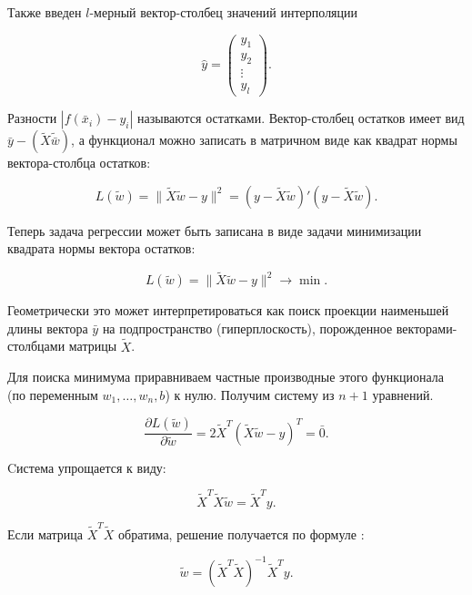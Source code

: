 \documentclass[11pt,a4paper]{article}
\begin{document}
Также введен $l$-мерный вектор-столбец значений интерполяции

\begin{equation}
\hat{y} = 
\begin{pmatrix}
y_1 \\
y_2 \\
\vdots \\
y_l
\end{pmatrix}.
\end{equation}

Разности $|f(\bar{x}_i) - y_i|$ называются остатками. Вектор-столбец остатков имеет вид $\bar{y} - (\tilde{X} \tilde{\bar{w}})$, а функционал можно записать в матричном виде как квадрат нормы вектора-столбца остатков:

\begin{equation}
L(\tilde{w}) = \|\tilde{X} \tilde{w} - y\|^2 = (y - \tilde{X} \tilde{w})' (y - \tilde{X} \tilde{w}).
\end{equation}

Теперь задача регрессии может быть записана в виде задачи минимизации квадрата нормы вектора остатков:

\begin{equation}
L(\tilde{w}) = \|\tilde{X} \tilde{w} - y\|^2 \rightarrow \min.
\end{equation}

\sloppy
Геометрически это может интерпретироваться как поиск проекции наименьшей длины вектора $\bar{y}$ на подпространство (гиперплоскость), порожденное векторами-столбцами матрицы $\tilde{X}$.

Для поиска минимума приравниваем частные производные этого функционала (по переменным $w_1, \ldots, w_n, b$) к нулю. Получим систему из $n + 1$ уравнений.

\begin{equation}
\frac{\partial L(\tilde{w})}{\partial \tilde{w}} = 2 \tilde{X}^T (\tilde{X} \tilde{w} - y)^T = \bar{0}.
\end{equation}

Cистема упрощается к виду:

\begin{equation}
\tilde{X}^T \tilde{X} \tilde{w} = \tilde{X}^T y.
\end{equation}

Если матрица $\tilde{X}^T \tilde{X}$ обратима, решение получается по формуле \cite{vyugin}:

\begin{equation}
\tilde{w} = (\tilde{X}^T \tilde{X})^{-1} \tilde{X}^T y.
\end{equation}
\end{document}
